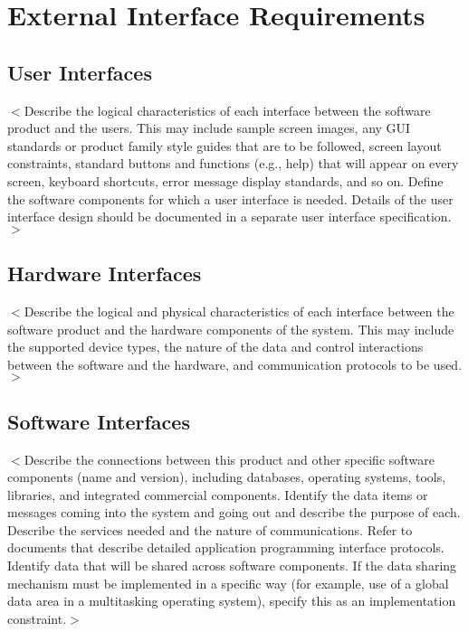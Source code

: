 \documentclass{scrreprt}
\begin{document}
\begin{CJK*}{UTF8}{bsmi}
\begin{center}
\begin{tabular}{|l|l|}
\end{tabular}
\end{center}

\chapter{External Interface Requirements}

\section{User Interfaces}
$<$Describe the logical characteristics of each interface between the software 
product and the users. This may include sample screen images, any GUI standards 
or product family style guides that are to be followed, screen layout 
constraints, standard buttons and functions (e.g., help) that will appear on 
every screen, keyboard shortcuts, error message display standards, and so on.  
Define the software components for which a user interface is needed. Details of 
the user interface design should be documented in a separate user interface 
specification.$>$

\section{Hardware Interfaces}
$<$Describe the logical and physical characteristics of each interface between 
the software product and the hardware components of the system. This may include 
the supported device types, the nature of the data and control interactions 
between the software and the hardware, and communication protocols to be 
used.$>$

\section{Software Interfaces}
$<$Describe the connections between this product and other specific software 
components (name and version), including databases, operating systems, tools, 
libraries, and integrated commercial components. Identify the data items or 
messages coming into the system and going out and describe the purpose of each.  
Describe the services needed and the nature of communications. Refer to 
documents that describe detailed application programming interface protocols.  
Identify data that will be shared across software components. If the data 
sharing mechanism must be implemented in a specific way (for example, use of a 
global data area in a multitasking operating system), specify this as an 
implementation constraint.$>$



\end{CJK*}
\end{document}
